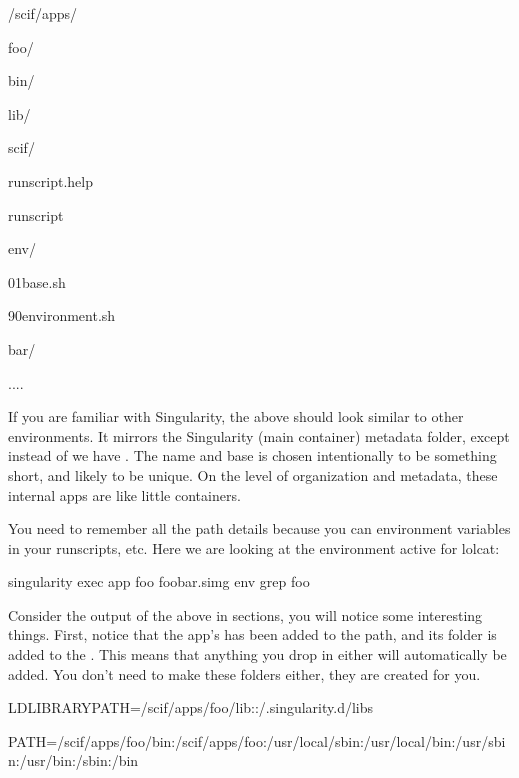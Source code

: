 \documentclass[letterpaper,10pt,english]{sphinxmanual}
\begin{document}
%
\begin{sphinxVerbatim}[commandchars=\\\{\}]
/scif/apps/


     foo/

        bin/

        lib/

        scif/

            runscript.help

            runscript

            env/

                01\PYGZhy{}base.sh

                90\PYGZhy{}environment.sh


     bar/

     ....
\end{sphinxVerbatim}

If you are familiar with Singularity, the above should look similar to other environments.
It mirrors the Singularity (main container) metadata folder, except
instead of  we have . The name and base  is chosen intentionally to be
something short, and likely to be unique. On the level of organization
and metadata, these internal apps are like little containers.

You need to remember all the path details because you can environment variables in your runscripts,
etc. Here we are looking at the environment active for lolcat:

%
\begin{sphinxVerbatim}[commandchars=\\\{\}]
singularity exec \PYGZhy{}\PYGZhy{}app foo foobar.simg env \textbar{} grep foo
\end{sphinxVerbatim}

Consider the output of the above in sections, you will notice
some interesting things. First, notice that the app’s  has been added to
the path, and its  folder is added to the  . This means that anything you drop in
either will automatically be added. You don’t need to make these folders
either, they are created for you.

%
\begin{sphinxVerbatim}[commandchars=\\\{\}]
LD\PYGZus{}LIBRARY\PYGZus{}PATH=/scif/apps/foo/lib::/.singularity.d/libs

PATH=/scif/apps/foo/bin:/scif/apps/foo:/usr/local/sbin:/usr/local/bin:/usr/sbin:/usr/bin:/sbin:/bin
\end{sphinxVerbatim}
\end{document}
